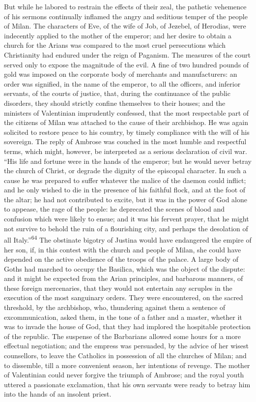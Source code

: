 But while he labored to restrain the effects of their zeal, the
pathetic vehemence of his sermons continually inflamed the angry
and seditious temper of the people of Milan. The characters of
Eve, of the wife of Job, of Jezebel, of Herodias, were indecently
applied to the mother of the emperor; and her desire to obtain a
church for the Arians was compared to the most cruel persecutions
which Christianity had endured under the reign of Paganism. The
measures of the court served only to expose the magnitude of the
evil. A fine of two hundred pounds of gold was imposed on the
corporate body of merchants and manufacturers: an order was
signified, in the name of the emperor, to all the officers, and
inferior servants, of the courts of justice, that, during the
continuance of the public disorders, they should strictly confine
themselves to their houses; and the ministers of Valentinian
imprudently confessed, that the most respectable part of the
citizens of Milan was attached to the cause of their archbishop.
He was again solicited to restore peace to his country, by timely
compliance with the will of his sovereign. The reply of Ambrose
was couched in the most humble and respectful terms, which might,
however, be interpreted as a serious declaration of civil war.
“His life and fortune were in the hands of the emperor; but he
would never betray the church of Christ, or degrade the dignity
of the episcopal character. In such a cause he was prepared to
suffer whatever the malice of the daemon could inflict; and he
only wished to die in the presence of his faithful flock, and at
the foot of the altar; he had not contributed to excite, but it
was in the power of God alone to appease, the rage of the people:
he deprecated the scenes of blood and confusion which were likely
to ensue; and it was his fervent prayer, that he might not
survive to behold the ruin of a flourishing city, and perhaps the
desolation of all Italy.”\textsuperscript{64} The obstinate bigotry of Justina
would have endangered the empire of her son, if, in this contest
with the church and people of Milan, she could have depended on
the active obedience of the troops of the palace. A large body of
Goths had marched to occupy the Basilica, which was the object of
the dispute: and it might be expected from the Arian principles,
and barbarous manners, of these foreign mercenaries, that they
would not entertain any scruples in the execution of the most
sanguinary orders. They were encountered, on the sacred
threshold, by the archbishop, who, thundering against them a
sentence of excommunication, asked them, in the tone of a father
and a master, whether it was to invade the house of God, that
they had implored the hospitable protection of the republic. The
suspense of the Barbarians allowed some hours for a more
effectual negotiation; and the empress was persuaded, by the
advice of her wisest counsellors, to leave the Catholics in
possession of all the churches of Milan; and to dissemble, till a
more convenient season, her intentions of revenge. The mother of
Valentinian could never forgive the triumph of Ambrose; and the
royal youth uttered a passionate exclamation, that his own
servants were ready to betray him into the hands of an insolent
priest.

